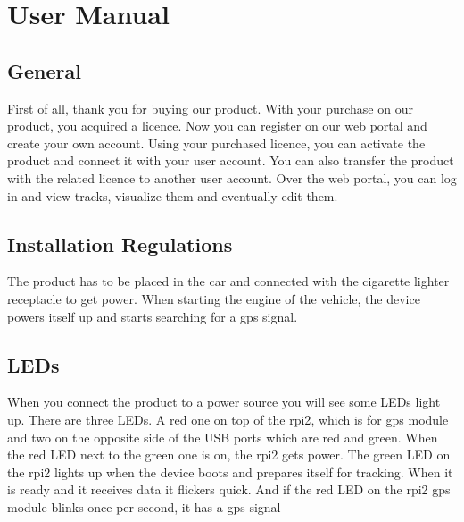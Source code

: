 \chapter{User Manual}
\section{General}
First of all, thank you for buying our product. With your purchase on our product, you acquired a licence. Now you can register on our web portal and create your own account. Using your purchased licence, you can activate the product and connect it with your user account. You can also transfer the product with the related licence to another user account. Over the web portal, you can log in and view tracks, visualize them and eventually edit them.
\section{Installation Regulations}
The product has to be placed in the car and connected with the cigarette lighter receptacle to get power. When starting the engine of the vehicle, the device powers itself up and starts searching for a \gls{gps} signal.
\section{LEDs}
When you connect the product to a power source you will see some LEDs light up.
There are three LEDs. A red one on top of the \gls{rpi2}, which is for \gls{gps} module and two on the opposite side of the USB ports which are red and green.
When the red LED next to the green one is on, the \gls{rpi2} gets power.
The green LED on the \gls{rpi2} lights up when the device boots and prepares itself for tracking. When it is ready and it receives data it flickers quick.
And if the red LED on the \gls{rpi2} \gls{gps} module blinks once per second, it has a \gls{gps} signal
